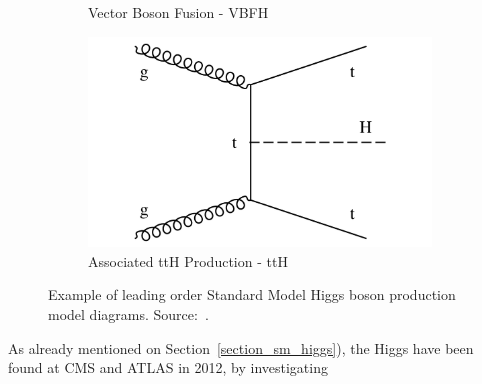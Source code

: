 \begin{figure}[htbp]
\begin{subfigure}[htbp]{0.48\textwidth}
    \caption{Vector Boson Fusion - VBFH}
  \end{subfigure}
  \hfill
  \begin{subfigure}[htbp]{0.48\textwidth}
    \centering
    \includegraphics[width=\textwidth]{figures_and_tables/theory/higgs_prod_and_decays/tth.pdf}
    \caption{Associated ttH Production - ttH}
  \end{subfigure}
  \caption{ Example of leading order Standard Model Higgs boson production model diagrams. Source:~\cite{higgs_diagrams}.}
  \label{fig_diagrams_production_modes}
\end{figure}



As already mentioned on Section~\ref{section_sm_higgs}), the Higgs have been found at CMS and ATLAS in 2012, by investigating 


